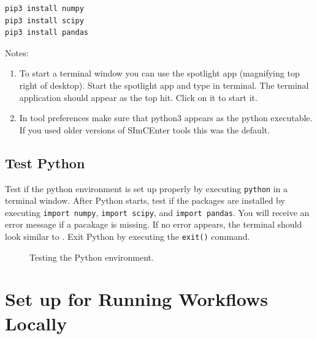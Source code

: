 \begin{enumerate}
\begin{verbatim}
pip3 install numpy
pip3 install scipy
pip3 install pandas
\end{verbatim}

Notes: 
\begin{enumerate}
\item To start a terminal window you can use the spotlight app (magnifying top right of desktop). Start the spotlight app and type in terminal. The terminal application should appear as the top hit. Click on it to start it.
\item In tool preferences make sure that python3 appears as the python executable. If you used older versions of SImCEnter tools this was the default.
\end{enumerate}
\end{enumerate} 

\subsection{Test Python}

Test if the python environment is set up properly by
executing \texttt{python} in a terminal window. After Python starts,
test if the packages are installed by executing \texttt{import
numpy}, \texttt{import scipy}, and \texttt{import pandas}. You will
receive an error message if a pacakage is missing. If no error
appears, the terminal should look similar
to . Exit Python by executing
the \texttt{exit()} command.

\begin{figure}[!htbp]
  \caption{Testing the Python environment.}
  \label{fig:python_test}
\end{figure}

\section{Set up for Running Workflows Locally}\label{setup}

